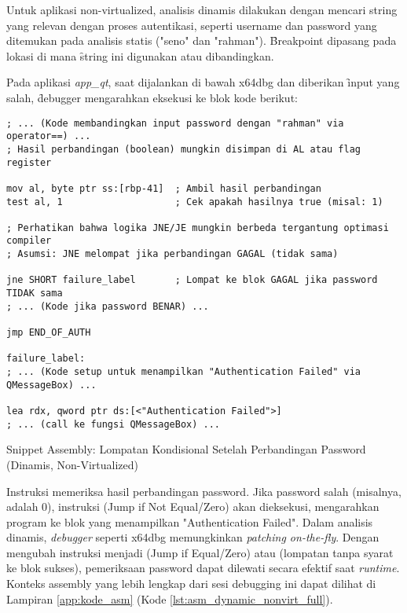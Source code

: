 Untuk aplikasi non-virtualized, analisis dinamis dilakukan dengan mencari string yang relevan dengan proses autentikasi, seperti username dan password yang ditemukan pada analisis statis ("seno" dan "rahman"). \f{Breakpoint} dipasang pada lokasi di mana \f{string} ini digunakan atau dibandingkan.

Pada aplikasi \textit{app\_qt}, saat dijalankan di bawah x64dbg dan diberikan \f{input} yang salah, \f{debugger} mengarahkan eksekusi ke blok kode berikut:

\begin{listing}[H]
    \begin{verbatim}
; ... (Kode membandingkan input password dengan "rahman" via operator==) ...
; Hasil perbandingan (boolean) mungkin disimpan di AL atau flag register

mov al, byte ptr ss:[rbp-41]  ; Ambil hasil perbandingan
test al, 1                    ; Cek apakah hasilnya true (misal: 1)

; Perhatikan bahwa logika JNE/JE mungkin berbeda tergantung optimasi compiler
; Asumsi: JNE melompat jika perbandingan GAGAL (tidak sama)

jne SHORT failure_label       ; Lompat ke blok GAGAL jika password TIDAK sama
; ... (Kode jika password BENAR) ...

jmp END_OF_AUTH

failure_label:
; ... (Kode setup untuk menampilkan "Authentication Failed" via QMessageBox) ...

lea rdx, qword ptr ds:[<"Authentication Failed">]
; ... (call ke fungsi QMessageBox) ...

\end{verbatim}
\caption{Snippet Assembly: Lompatan Kondisional Setelah Perbandingan Password (Dinamis, Non-Virtualized)}
\label{lst:asm_dynamic_nonvirt_snippet} %
\end{listing}

Instruksi  memeriksa hasil perbandingan password. Jika password salah (misalnya,  adalah 0), instruksi  (Jump if Not Equal/Zero) akan dieksekusi, mengarahkan program ke blok yang menampilkan "Authentication Failed". Dalam analisis dinamis, \textit{debugger} seperti x64dbg memungkinkan \textit{patching on-the-fly}. Dengan mengubah instruksi  menjadi  (Jump if Equal/Zero) atau  (lompatan tanpa syarat ke blok sukses), pemeriksaan password dapat dilewati secara efektif saat \textit{runtime}. Konteks assembly yang lebih lengkap dari sesi debugging ini dapat dilihat di Lampiran \ref{app:kode_asm} (Kode \ref{lst:asm_dynamic_nonvirt_full}).

